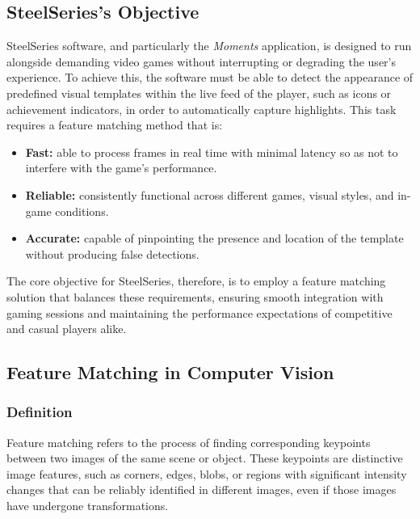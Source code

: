 \subsection{SteelSeries’s Objective}
SteelSeries software, and particularly the \textit{Moments} application, is designed to run alongside demanding video games without interrupting or degrading the user’s experience. To achieve this, the software must be able to detect the appearance of predefined visual templates within the live feed of the player, such as icons or achievement indicators, in order to automatically capture highlights. This task requires a feature matching method that is:

\begin{itemize}
    \item \textbf{Fast:} able to process frames in real time with minimal latency so as not to interfere with the game’s performance.
    \item \textbf{Reliable:} consistently functional across different games, visual styles, and in-game conditions.
    \item \textbf{Accurate:} capable of pinpointing the presence and location of the template without producing false detections.
\end{itemize}

The core objective for SteelSeries, therefore, is to employ a feature matching solution that balances these requirements, ensuring smooth integration with gaming sessions and maintaining the performance expectations of competitive and casual players alike.

\subsection{Feature Matching in Computer Vision}
\subsubsection{Definition}
Feature matching refers to the process of finding corresponding keypoints between two images of the same scene or object. These keypoints are distinctive image features, such as corners, edges, blobs, or regions with significant intensity changes that can be reliably identified in different images, even if those images have undergone transformations.
